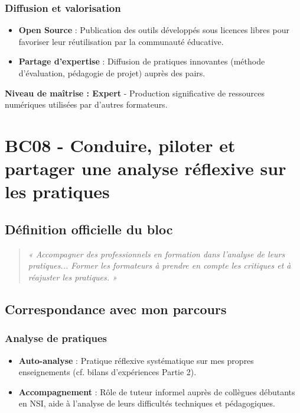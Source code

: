 \subsubsection{Diffusion et valorisation}
\begin{itemize}[leftmargin=*]
    \item \textbf{Open Source} : Publication des outils développés sous licences libres pour favoriser leur réutilisation par la communauté éducative.
    \item \textbf{Partage d'expertise} : Diffusion de pratiques innovantes (méthode d'évaluation, pédagogie de projet) auprès des pairs.
\end{itemize}

\textbf{Niveau de maîtrise : Expert} - Production significative de ressources numériques utilisées par d'autres formateurs.

\vspace{1cm}

\section{BC08 - Conduire, piloter et partager une analyse réflexive sur les pratiques}

\subsection{Définition officielle du bloc}
\begin{quote}
\textit{« Accompagner des professionnels en formation dans l'analyse de leurs pratiques... Former les formateurs à prendre en compte les critiques et à réajuster les pratiques. »} \parencite{rncp38152}
\end{quote}

\subsection{Correspondance avec mon parcours}

\subsubsection{Analyse de pratiques}
\begin{itemize}[leftmargin=*]
    \item \textbf{Auto-analyse} : Pratique réflexive systématique sur mes propres enseignements (cf. bilans d'expériences Partie 2).
    \item \textbf{Accompagnement} : Rôle de tuteur informel auprès de collègues débutants en NSI, aide à l'analyse de leurs difficultés techniques et pédagogiques.
\end{itemize}

